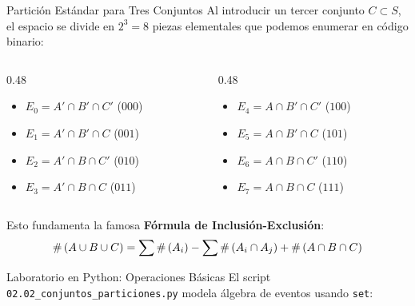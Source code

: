\begin{frame}{Partición Estándar para Tres Conjuntos}
  Al introducir un tercer conjunto $C \subset S$, el espacio se divide en $2^3 = 8$ piezas elementales que podemos enumerar en código binario:
  
  \vspace{0.2em}
  \begin{columns}[T]
    \begin{column}{0.48\textwidth}
      \small
      \begin{itemize}
        \item $E_0 = A' \cap B' \cap C'$ \quad ($000$)
        \item $E_1 = A' \cap B' \cap C$ \quad ($001$)
        \item $E_2 = A' \cap B \cap C'$ \quad ($010$)
        \item $E_3 = A' \cap B \cap C$ \quad ($011$)
      \end{itemize}
    \end{column}
    \begin{column}{0.48\textwidth}
      \small
      \begin{itemize}
        \item $E_4 = A \cap B' \cap C'$ \quad ($100$)
        \item $E_5 = A \cap B' \cap C$ \quad ($101$)
        \item $E_6 = A \cap B \cap C'$ \quad ($110$)
        \item $E_7 = A \cap B \cap C$ \quad ($111$)
      \end{itemize}
    \end{column}
  \end{columns}
  
  \vspace{0.3em}
  \pause
  \begin{center}
    \small Esto fundamenta la famosa \textbf{Fórmula de Inclusión-Exclusión}:
    \[ \#\left( A \cup B \cup C \right) = \sum \#\left( A_i \right) - \sum \#\left( A_i \cap A_j \right) + \#\left( A \cap B \cap C \right) \]
  \end{center}
\end{frame}

\begin{frame}[fragile]{Laboratorio en Python: Operaciones Básicas}
  El script \texttt{02.02\_conjuntos\_particiones.py} modela álgebra de eventos usando \texttt{set}:
  \vspace{0.2em}
  {
  }
\end{frame}

